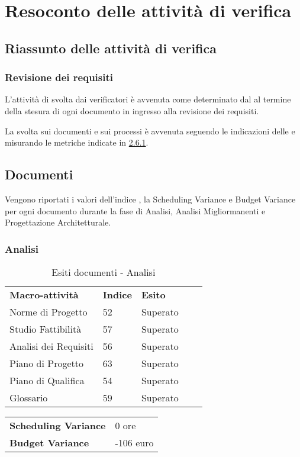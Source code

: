 \newpage
\section{Resoconto delle attività di verifica} \label{App:AppendixA}
	\subsection{Riassunto delle attività di verifica} \label{App:AppendixA}
		\subsubsection{Revisione dei requisiti} \label{App:AppendixA}
			
			L'attività di  svolta dai verificatori è avvenuta come determinato dal \PianoDiProgetto al termine della stesura di ogni documento in ingresso alla revisione dei requisiti.
			
			La  svolta sui documenti e sui processi è avvenuta seguendo le indicazioni delle \NormeDiProgetto e misurando le metriche indicate in \hyperlink{metriche_documenti}{2.6.1}.
\subsection{Documenti} \label{App:AppendixB}
Vengono riportati i valori dell’indice , la Scheduling Variance e Budget Variance per ogni documento durante la fase di Analisi, Analisi Migliormanenti e Progettazione Architetturale. 
\subsubsection{Analisi}
		\begin{table}[!ht]
			\centering
				\begin{tabular}{|l|l|l|ll}
					\cline{1-3}
					 \textbf{Macro-attività}  & \textbf{Indice \glossaryItem{Gulpease}}  & \textbf{Esito}  &  \\ \cline{1-3}
					 Norme di Progetto  & 52 & Superato &  \\ \cline{1-3}
					 Studio Fattibilità & 57 & Superato &  \\ \cline{1-3}
					 Analisi dei Requisiti & 56 & Superato &  \\ \cline{1-3}
					 Piano di Progetto & 63 & Superato &  \\ \cline{1-3}
					 Piano di Qualifica & 54 & Superato &  \\ \cline{1-3}
					 Glossario & 59 & Superato &  \\ \cline{1-3}
				\end{tabular}
				\caption{Esiti  documenti - Analisi}
		\end{table}
		\begin{table}[!ht]
		\centering
		\begin{tabular}{l|l}
		\textbf{Scheduling Variance} & 0 ore \\
		\textbf{Budget Variance} & -106 euro \\
		\end{tabular}
		\end{table}

